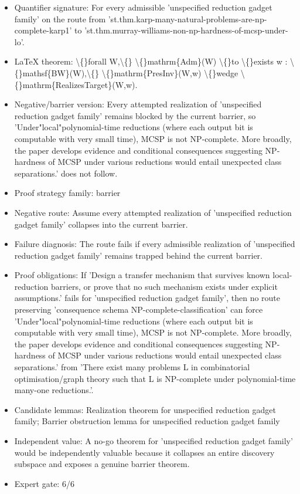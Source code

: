 \documentclass[11pt]{article}
\begin{document}
\begin{itemize}
\item Quantifier signature: For every admissible 'unspecified reduction gadget family' on the route from 'st.thm.karp-many-natural-problems-are-np-complete-karp1' to 'st.thm.murray-williams-non-np-hardness-of-mcsp-under-lo'.
\item LaTeX theorem: \textbackslash\{\}forall W,\textbackslash\{\} \textbackslash\{\}mathrm\{Adm\}(W) \textbackslash\{\}to \textbackslash\{\}exists w : \textbackslash\{\}mathsf\{BW\}(W),\textbackslash\{\} \textbackslash\{\}mathrm\{PresInv\}(W,w) \textbackslash\{\}wedge \textbackslash\{\}mathrm\{RealizesTarget\}(W,w).
\item Negative/barrier version: Every attempted realization of 'unspecified reduction gadget family' remains blocked by the current barrier, so 'Under"local"polynomial-time reductions (where each output bit is computable with very small time), MCSP is not NP-complete. More broadly, the paper develops evidence and conditional consequences suggesting NP-hardness of MCSP under various reductions would entail unexpected class separations.' does not follow.
\item Proof strategy family: barrier
\item Negative route: Assume every attempted realization of 'unspecified reduction gadget family' collapses into the current barrier.
\item Failure diagnosis: The route fails if every admissible realization of 'unspecified reduction gadget family' remains trapped behind the current barrier.
\item Proof obligations: If 'Design a transfer mechanism that survives known local-reduction barriers, or prove that no such mechanism exists under explicit assumptions.' fails for 'unspecified reduction gadget family', then no route preserving 'consequence schema NP-complete-classification' can force 'Under"local"polynomial-time reductions (where each output bit is computable with very small time), MCSP is not NP-complete. More broadly, the paper develops evidence and conditional consequences suggesting NP-hardness of MCSP under various reductions would entail unexpected class separations.' from 'There exist many problems L in combinatorial optimisation/graph theory such that L is NP-complete under polynomial-time many-one reductions.'.
\item Candidate lemmas: Realization theorem for unspecified reduction gadget family; Barrier obstruction lemma for unspecified reduction gadget family
\item Independent value: A no-go theorem for 'unspecified reduction gadget family' would be independently valuable because it collapses an entire discovery subspace and exposes a genuine barrier theorem.
\item Expert gate: 6/6
\end{itemize}
\end{document}
